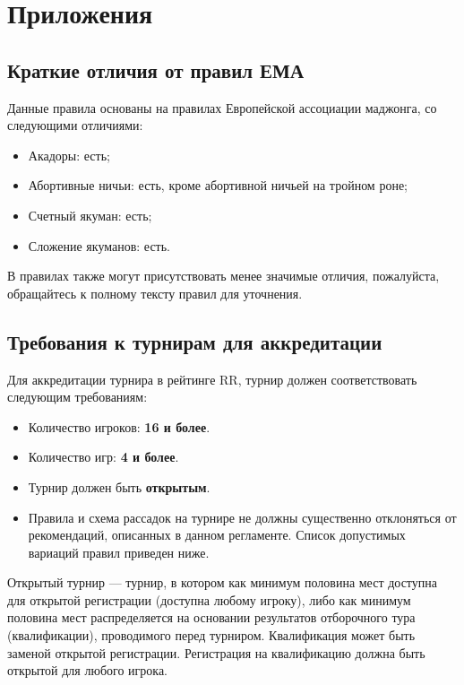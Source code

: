 \section{Приложения}

\subsection{Краткие отличия от правил ЕМА}

Данные правила основаны на правилах Европейской ассоциации маджонга, со следующими отличиями:

\begin{itemize}
	\item Акадоры: есть;
	\item Абортивные ничьи: есть, кроме абортивной ничьей на тройном роне;
	\item Счетный якуман: есть;
	\item Сложение якуманов: есть.
\end{itemize}

В правилах также могут присутствовать менее значимые отличия, пожалуйста, обращайтесь к полному тексту правил для уточнения.

\newpage

\subsection{Требования к турнирам для аккредитации}

Для аккредитации турнира в рейтинге RR, турнир должен соответствовать следующим требованиям:

\begin{itemize}
	\item Количество игроков: \textbf{16 и более}.
	\item Количество игр: \textbf{4 и более}.
	\item Турнир должен быть \textbf{открытым}.
	\item Правила и схема рассадок на турнире не должны существенно отклоняться от рекомендаций, описанных в данном регламенте. Список допустимых вариаций правил приведен ниже.
\end{itemize}

Открытый турнир --- турнир, в котором как минимум половина мест доступна для открытой регистрации (доступна любому игроку), либо как минимум половина мест распределяется на основании результатов отборочного тура (квалификации), проводимого перед турниром. Квалификация может быть заменой открытой регистрации. Регистрация на квалификацию должна быть открытой для любого игрока.

